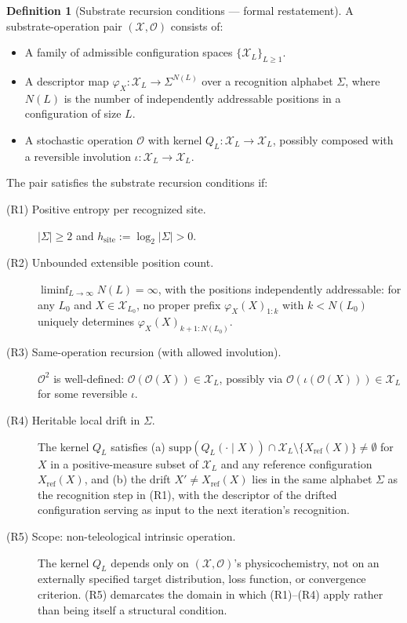 \documentclass[11pt]{article}
\theoremstyle{plain}
\theoremstyle{definition}
\newtheorem{definition}[theorem]{Definition}
\newcommand{\descX}{\varphi_X}
\newcommand{\Xset}{\mathcal{X}}
\newcommand{\Op}{\mathcal{O}}
\begin{document}
\begin{definition}[Substrate recursion conditions --- formal restatement]
\label{def:conditions_formal}
A substrate-operation pair $(\Xset, \Op)$ consists of:
\begin{itemize}
  \item A family of admissible configuration spaces $\{\Xset_L\}_{L \ge 1}$.
  \item A descriptor map $\descX: \Xset_L \to \Sigma^{N(L)}$ over a recognition alphabet $\Sigma$, where $N(L)$ is the number of independently addressable positions in a configuration of size $L$.
  \item A stochastic operation $\Op$ with kernel $Q_L: \Xset_L \to \Xset_L$, possibly composed with a reversible involution $\iota: \Xset_L \to \Xset_L$.
\end{itemize}

The pair satisfies the substrate recursion conditions if:

\begin{description}
\item[(R1) Positive entropy per recognized site.] $|\Sigma| \ge 2$ and $h_{\mathrm{site}} := \log_2 |\Sigma| > 0$.

\item[(R2) Unbounded extensible position count.] $\liminf_{L \to \infty} N(L) = \infty$, with the positions independently addressable: for any $L_0$ and $X \in \Xset_{L_0}$, no proper prefix $\descX(X)_{1:k}$ with $k < N(L_0)$ uniquely determines $\descX(X)_{k+1:N(L_0)}$.

\item[(R3) Same-operation recursion (with allowed involution).] $\Op^2$ is well-defined: $\Op(\Op(X)) \in \Xset_L$, possibly via $\Op(\iota(\Op(X))) \in \Xset_L$ for some reversible $\iota$.

\item[(R4) Heritable local drift in $\Sigma$.] The kernel $Q_L$ satisfies (a) $\mathrm{supp}(Q_L(\cdot \mid X)) \cap \Xset_L \setminus \{X_{\mathrm{ref}}(X)\} \neq \emptyset$ for $X$ in a positive-measure subset of $\Xset_L$ and any reference configuration $X_{\mathrm{ref}}(X)$, and (b) the drift $X' \neq X_{\mathrm{ref}}(X)$ lies in the same alphabet $\Sigma$ as the recognition step in (R1), with the descriptor of the drifted configuration serving as input to the next iteration's recognition.

\item[(R5) Scope: non-teleological intrinsic operation.] The kernel $Q_L$ depends only on $(\Xset, \Op)$'s physicochemistry, not on an externally specified target distribution, loss function, or convergence criterion. (R5) demarcates the domain in which (R1)--(R4) apply rather than being itself a structural condition.
\end{description}
\end{definition}
\end{document}
